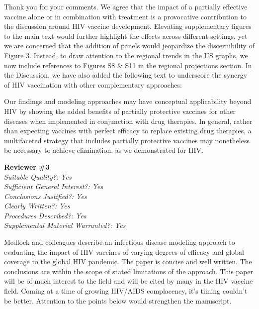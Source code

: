 \documentclass[12pt]{jpmletter}
\newcommand{\section}[1]{\textbf{#1}\\}
\newenvironment{original}{\it}{}
\begin{document}
\begin{letter}{}
    Thank you for your comments. We agree that the impact of a
    partially effective vaccine alone or in combination with treatment
    is a provocative contribution to the discussion around HIV vaccine
    development. Elevating supplementary figures to the main text
    would further highlight the effects across different settings, yet
    we are concerned that the addition of panels would jeopardize the
    discernibility of Figure 3. Instead, to draw attention to the
    regional trends in the US graphs, we now include references to
    Figures S8 \& S11 in the regional projections section. In the
    Discussion, we have also added the following text to underscore
    the synergy of HIV vaccination with other complementary
    approaches:
    \begin{quoting}
      Our findings and modeling approaches may have conceptual
      applicability beyond HIV by showing the added benefits of
      partially protective vaccines for other diseases when
      implemented in conjunction with drug therapies. In general,
      rather than expecting vaccines with perfect efficacy to replace
      existing drug therapies, a multifaceted strategy that includes
      partially protective vaccines may nonetheless be necessary to
      achieve elimination, as we demonstrated for HIV.
    \end{quoting}
    
    \section{Reviewer \#3}
    \begin{original}
      Suitable Quality?: Yes\\
      Sufficient General Interest?: Yes\\
      Conclusions Justified?: Yes\\
      Clearly Written?: Yes\\
      Procedures Described?: Yes\\
      Supplemental Material Warranted?: Yes 

      Medlock and colleagues describe an infectious disease modeling
      approach to evaluating the impact of HIV vaccines of varying
      degrees of efficacy and global coverage to the global HIV
      pandemic. The paper is concise and well written. The conclusions
      are within the scope of stated limitations of the approach. This
      paper will be of much interest to the field and will be cited by
      many in the HIV vaccine field. Coming at a time of growing
      HIV/AIDS complacency, it's timing couldn't be better. Attention
      to the points below would strengthen the manuscript.


\end{original}
\end{letter}
\end{document}
